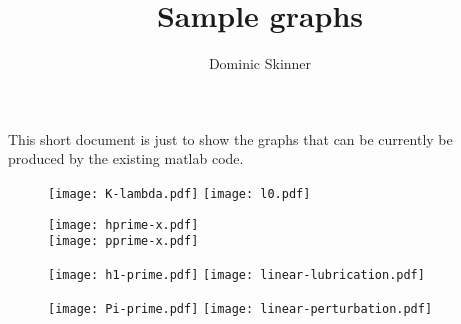 \documentclass{article}
\begin{document}
\title{Sample graphs}
\author{Dominic Skinner}
\maketitle
This short document is just to show the graphs that can be
currently be produced by the existing matlab code. 
\begin{figure}[ht]\centering
\texttt{[image: K-lambda.pdf]}
\texttt{[image: l0.pdf]}
\end{figure}
%
\begin{figure}[!ht]\centering
\texttt{[image: hprime-x.pdf]}
\\[8pt]
\texttt{[image: pprime-x.pdf]}
\end{figure}
%
\begin{figure}[!ht]\centering
\texttt{[image: h1-prime.pdf]}
\texttt{[image: linear-lubrication.pdf]}
\end{figure}
%
\begin{figure}[!ht]\centering
\texttt{[image: Pi-prime.pdf]}
\texttt{[image: linear-perturbation.pdf]}
\end{figure}
\end{document}
